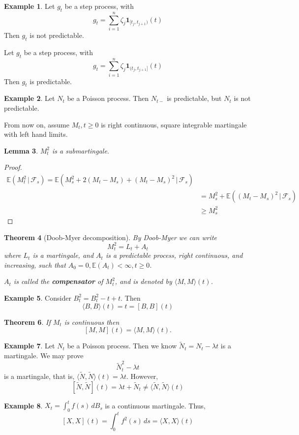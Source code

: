 \documentclass[10pt, oneside, reqno]{amsart}
\theoremstyle{plain}%
\newtheorem{thm}{Theorem}[section]
\newtheorem{lem}[thm]{Lemma}
\theoremstyle{definition}
\newtheorem{exmp}[thm]{Example}
\theoremstyle{remark}
\newcommand{\given}{ \, | \,}
\newcommand{\E}{\mathbb{E}}
\newcommand{\sigf}{\mathcal{F}}
\begin{document}
\begin{exmp}
	Let $g_t$ be a step process, with \[
		g_t = \sum_{i=1}^n \zeta_j \mathbf{1}_{[t_j, t_{j+1})}(t)
	\] Then $g_t$ is not predictable.  
	
	Let $g_t$ be a step process, with \[
		g_t = \sum_{i=1}^n \zeta_j \mathbf{1}_{(t_j, t_{j+1}]}(t)
	\] Then $g_t$ is predictable.  
\end{exmp}

\begin{exmp}
	Let $N_t$ be a Poisson process.  Then $N_{t-}$ is predictable, but $N_t$ is not predictable.
\end{exmp}

From now on, assume $M_t, t \geq 0$ is right continuous, square integrable martingale with left hand limits.  

\begin{lem}
	$M_t^2$ is a submartingale.
\end{lem}
\begin{proof}
	\begin{align*}
		\E(M_t^2 \given \sigf_s) = \E(M_s^2 + 2(M_t - M_s) + (M_t - M_s)^2 \given \sigf_s) \\
		&= M_s^2 + \E((M_t - M_s)^2 \given \sigf_s) \\
		&\geq M_s^2
	\end{align*}
\end{proof}

\begin{thm}[Doob-Myer decomposition]
	By Doob-Myer we can write \[
		M_t^2 = L_t + A_t
	\] where $L_t$ is a martingale, and $A_t$ is a predictable process, right continuous, and increasing, such that $A_0 = 0, \E(A_t) < \infty, t \geq 0$.  
	
	$A_t$ is called the \textbf{compensator} of $M_t^2$, and is denoted by $\langle M, M \rangle(t)$.
\end{thm}
\begin{exmp}
	Consider $B_t^2 = B_t^2 - t + t$.  Then \[
		\langle B, B \rangle(t) = t = [B, B](t)
	\]
\end{exmp}

\begin{thm}
	If $M_t$ is continuous then \[
		[M, M](t) = \langle M , M \rangle (t).
	\]
\end{thm}

\begin{exmp}
	Let $N_t$ be a Poisson process.  Then we know $\tilde N_t = N_t - \lambda t$ is a martingale.  We may prove \[
		\tilde N_t^2 - \lambda t
	\] is a martingale, that is, $\langle \tilde N, \tilde N \rangle(t)=\lambda t$.  However, \[
		[\tilde N, \tilde N](t) = \lambda t + \tilde N_t \neq \langle \tilde N, \tilde N \rangle (t)
	\]
\end{exmp}
\begin{exmp}
	$X_t = \int_0^t f(s) \, dB_s$ is a continuous martingale.  Thus, \[
		[X, X](t) = \int_0^t f^2(s) \, ds = \langle X, X \rangle(t)
	\]	
\end{exmp}
\end{document}
